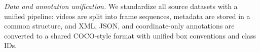 \documentclass{article}
\begin{document}

\noindent \textit{Data and annotation unification.}
We standardize all source datasets with a unified pipeline: videos are split into frame sequences, metadata are stored in a common structure, and XML, JSON, and coordinate-only annotations are converted to a shared COCO-style format with unified box conventions and class IDs. %
\end{document}
